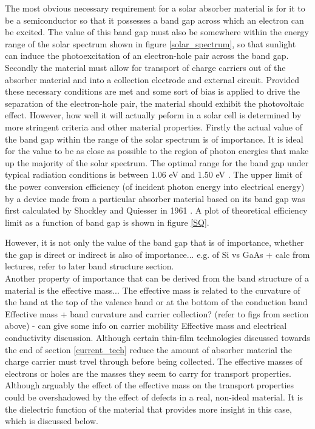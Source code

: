The most obvious necessary requirement for a solar absorber material is for it to be a semiconductor so that it possesses a band gap across which an electron can be excited. The value of this band gap must also be somewhere within the energy range of the solar spectrum shown in figure \ref{solar_spectrum}, so that sunlight can induce the photoexcitation of an electron-hole pair across the band gap. Secondly the material must allow for transport of charge carriers out of the absorber material and into a collection electrode and external circuit. Provided these necessary conditions are met and some sort of bias is applied to drive the separation of the electron-hole pair, the material should exhibit the photovoltaic effect. However, how well it will actually peform in a solar cell is determined by more stringent criteria and other material properties. Firstly the actual value of the band gap within the range of the solar spectrum is of importance. It is ideal for the value to be as close as possible to the region of photon energies that make up the majority of the solar spectrum. The optimal range for the band gap under typical radiation conditions is between 1.06 eV and 1.50 eV \cite{CZTS_book}. The upper limit of the power conversion efficiency (of incident photon energy into electrical energy) by a device made from a particular absorber material based on its band gap was first calculated by Shockley and Quiesser in 1961 \cite{SQ_1961}. A plot of theoretical efficiency limit as a function of band gap is shown in figure \ref{SQ}.

However, it is not only the value of the band gap that is of importance, whether the gap is direct or indirect is also of importance... e.g. of Si vs GaAs + calc from lectures, refer to later band structure section.\\

Another property of importance that can be derived from the band structure of a material is the effective mass... The effective mass is related to the curvature of the band at the top of the valence band or at the bottom of the conduction band
Effective mass + band curvature and carrier collection? (refer to figs from section above) - can give some info on carrier mobility
Effective mass and electrical conductivity discussion.
Although certain thin-film technologies discussed towards the end of section \ref{current_tech} reduce the amount of absorber material the charge carrier must trvel through before being collected.
The effective masses of electrons or holes are the masses they seem to carry for transport properties.
Although arguably the effect of the effective mass on the transport properties could be overshadowed by the effect of defects in a real, non-ideal material. It is the dielectric function of the material that provides more insight in this case, which is discussed below.\\



